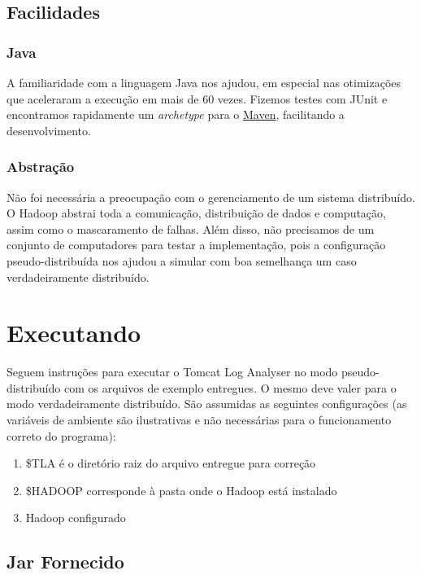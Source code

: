\documentclass[brazil, a4paper,12pt]{article}
\begin{document}
\subsection{Facilidades}

\subsubsection{Java}

A familiaridade com a linguagem Java nos ajudou, em especial nas otimizações
que aceleraram a execução em mais de 60 vezes. Fizemos testes com JUnit e
encontramos rapidamente um \emph{archetype} para o
\href{http://maven.apache.org/}{Maven}, facilitando a desenvolvimento.

\subsubsection{Abstração}

Não foi necessária a preocupação com o gerenciamento de um sistema
distribuído.  O Hadoop abstrai toda a comunicação, distribuição de dados e
computação, assim como o mascaramento de falhas. Além disso, não precisamos de
um conjunto de computadores para testar a implementação, pois a configuração
pseudo-distribuída nos ajudou a simular com boa semelhança um caso
verdadeiramente distribuído.

\section {Executando}

Seguem instruções para executar o Tomcat Log Analyser no modo
pseudo-distribuído com os arquivos de exemplo entregues. O mesmo deve valer
para o modo verdadeiramente distribuído. São assumidas as seguintes
configurações (as variáveis de ambiente são ilustrativas e não necessárias para
    o funcionamento correto do programa):

\begin{enumerate}
  \item \$TLA é o diretório raiz do arquivo entregue para correção
  \item \$HADOOP corresponde à pasta onde o Hadoop está instalado
  \item Hadoop configurado \end{enumerate}

\subsection {Jar Fornecido}
\end{document}
